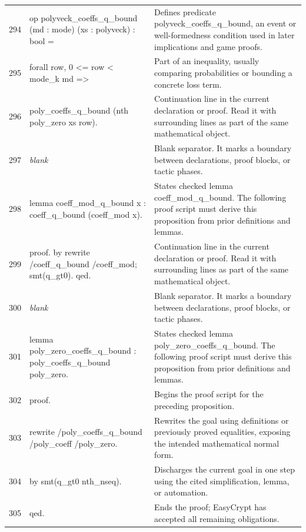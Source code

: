 \documentclass[10pt]{article}
\begin{document}
\begin{longtable}{r L{0.53\textwidth} L{0.37\textwidth}}
294 & {\ttfamily\scriptsize op polyveck\_coeffs\_q\_bound (md : mode) (xs : polyveck) : bool =} & Defines predicate polyveck\_coeffs\_q\_bound, an event or well-formedness condition used in later implications and game proofs. \\
295 & {\ttfamily\scriptsize   forall row, 0 <= row < mode\_k md =>} & Part of an inequality, usually comparing probabilities or bounding a concrete loss term. \\
296 & {\ttfamily\scriptsize     poly\_coeffs\_q\_bound (nth poly\_zero xs row).} & Continuation line in the current declaration or proof.  Read it with surrounding lines as part of the same mathematical object. \\
297 & {\ttfamily\scriptsize \emph{blank}} & Blank separator.  It marks a boundary between declarations, proof blocks, or tactic phases. \\
298 & {\ttfamily\scriptsize lemma coeff\_mod\_q\_bound x : coeff\_q\_bound (coeff\_mod x).} & States checked lemma coeff\_mod\_q\_bound.  The following proof script must derive this proposition from prior definitions and lemmas. \\
299 & {\ttfamily\scriptsize proof. by rewrite /coeff\_q\_bound /coeff\_mod; smt(q\_gt0). qed.} & Continuation line in the current declaration or proof.  Read it with surrounding lines as part of the same mathematical object. \\
300 & {\ttfamily\scriptsize \emph{blank}} & Blank separator.  It marks a boundary between declarations, proof blocks, or tactic phases. \\
301 & {\ttfamily\scriptsize lemma poly\_zero\_coeffs\_q\_bound : poly\_coeffs\_q\_bound poly\_zero.} & States checked lemma poly\_zero\_coeffs\_q\_bound.  The following proof script must derive this proposition from prior definitions and lemmas. \\
302 & {\ttfamily\scriptsize proof.} & Begins the proof script for the preceding proposition. \\
303 & {\ttfamily\scriptsize rewrite /poly\_coeffs\_q\_bound /poly\_coeff /poly\_zero.} & Rewrites the goal using definitions or previously proved equalities, exposing the intended mathematical normal form. \\
304 & {\ttfamily\scriptsize by smt(q\_gt0 nth\_nseq).} & Discharges the current goal in one step using the cited simplification, lemma, or automation. \\
305 & {\ttfamily\scriptsize qed.} & Ends the proof; EasyCrypt has accepted all remaining obligations. \\

\end{longtable}
\end{document}

